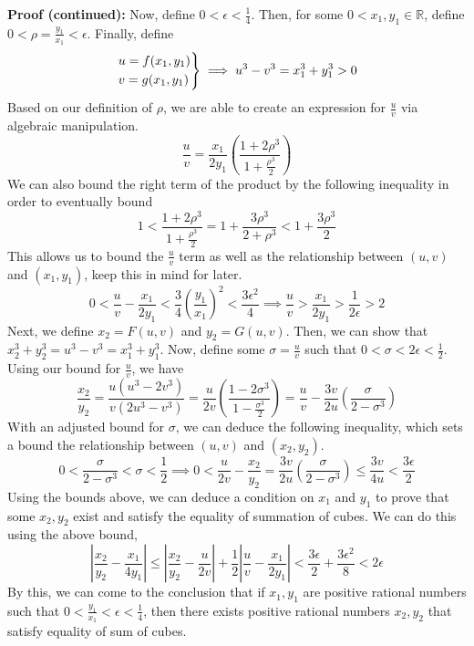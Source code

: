 \documentclass[8pt]{extarticle}
\begin{document}
\begin{boxedsection}

    \textbf{Proof (continued):} Now, define $0< \epsilon < \frac{1}{4}$. Then, for some $0 < x_1, y_1 \in \mathbb{R}$, define $0 < \rho = \frac{y_1}{x_1} < \epsilon$. Finally, define 
    $$
    \begin{rcases}
        u = f(x_1,y_1) \\
        v = g(x_1,y_1) 
    \end{rcases} \implies u^3 - v^3 = x_1^3 + y_1^3 > 0 
    $$
    Based on our definition of $\rho$, we are able to create an expression for $\frac{u}{v}$ via algebraic manipulation.
    $$
    \frac{u}{v} = \frac{x_1}{2y_1} \left(\frac{1 + 2\rho^3}{1+\frac{\rho^3}{2}}\right)
    $$
    We can also bound the right term of the product by the following inequality in order to eventually bound 
    $$
    1 < \frac{1 + 2\rho^3}{1+\frac{\rho^3}{2}} = 1 + \frac{3\rho^3}{2 + \rho^3} < 1 + \frac{3\rho^3}{2}
    $$
    This allows us to bound the $\frac{u}{v}$ term as well as the relationship between $(u,v)$ and $(x_1,y_1)$, keep this in mind for later.
    $$
    0 < \frac{u}{v} - \frac{x_1}{2y_1} < \frac{3}{4} \left(\frac{y_1}{x_1}\right)^2 < \frac{3\epsilon^2}{4} \implies \frac{u}{v} > \frac{x_1}{2y_1} > \frac{1}{2\epsilon} > 2
    $$
    Next, we define $x_2 = F(u,v)$ and $y_2 = G(u,v)$. Then, we can show that $x_2^3 + y_2^3 = u^3 - v^3 = x_1^3 + y_1^3$. Now, define some $\sigma = \frac{u}{v}$ such that $0 < \sigma < 2\epsilon < \frac{1}{2}$. Using our bound for $\frac{u}{v}$, we have
    $$
    \frac{x_2}{y_2} = \frac{u(u^3 - 2v^3)}{v(2u^3 - v^3)} = \frac{u}{2v}\left(\frac{1-2\sigma^3}{1-\frac{\sigma^3}{2}}\right) = \frac{u}{v} - \frac{3v}{2u}\left(\frac{\sigma}{2-\sigma^3}\right)
    $$
    With an adjusted bound for $\sigma$, we can deduce the following inequality, which sets a bound the relationship between $(u,v)$ and $(x_2,y_2)$.
    $$
    0 < \frac{\sigma}{2 - \sigma^3} < \sigma < \frac{1}{2} \implies 0 < \frac{u}{2v} - \frac{x_2}{y_2} = \frac{3v}{2u}\left(\frac{\sigma}{2-\sigma^3}\right) \leq \frac{3v}{4u} < \frac{3\epsilon}{2}
    $$
    Using the bounds above, we can deduce a condition on $x_1$ and $y_1$ to prove that some $x_2, y_2$ exist and satisfy the equality of summation of cubes. We can do this using the above bound,
    $$
    \left|\frac{x_2}{y_2} - \frac{x_1}{4y_1} \right| \leq \left|\frac{x_2}{y_2} - \frac{u}{2v}\right| + \frac{1}{2} \left|\frac{u}{v} - \frac{x_1}{2y_1}\right| < \frac{3\epsilon}{2} + \frac{3\epsilon^2}{8} < 2\epsilon
    $$
    By this, we can come to the conclusion that if $x_1, y_1$ are positive rational numbers such that $0 < \frac{y_1}{x_1} < \epsilon < \frac{1}{4}$, then there exists positive rational numbers $x_2, y_2$ that satisfy equality of sum of cubes. 

\end{boxedsection}
\end{document}
